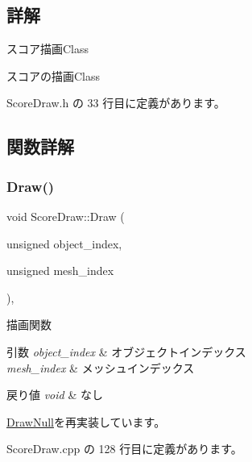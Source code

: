 \subsection{詳解}
スコア描画\+Class 

スコアの描画\+Class 

 Score\+Draw.\+h の 33 行目に定義があります。



\subsection{関数詳解}
\mbox{\label{class_score_draw_a799e71943140a264cedba6002308b976}} 
\subsubsection{\texorpdfstring{Draw()}{Draw()}}
{\footnotesize\ttfamily void Score\+Draw\+::\+Draw (\begin{DoxyParamCaption}\item[{unsigned}]{object\+\_\+index,  }\item[{unsigned}]{mesh\+\_\+index }\end{DoxyParamCaption})\hspace{0.3cm}{\ttfamily [override]}, {\ttfamily [virtual]}}



描画関数 


\begin{DoxyParams}{引数}
{\em object\+\_\+index} & オブジェクトインデックス \\
\hline
{\em mesh\+\_\+index} & メッシュインデックス \\
\hline
\end{DoxyParams}

\begin{DoxyRetVals}{戻り値}
{\em void} & なし \\
\hline
\end{DoxyRetVals}


\mbox{\hyperlink{class_draw_null_a72ac0b7dc40b1469582419dcc5b0e114}{Draw\+Null}}を再実装しています。



 Score\+Draw.\+cpp の 128 行目に定義があります。

\mbox{\label{class_score_draw_a15a6210aebf09d1472c4e4194950456c}} 
